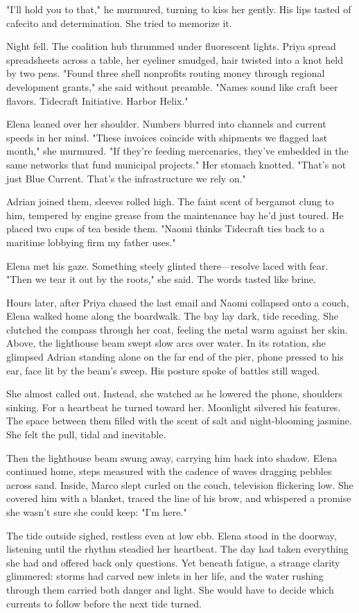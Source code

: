 "I'll hold you to that," he murmured, turning to kiss her gently. His lips tasted of cafecito and determination. She tried to memorize it.

Night fell. The coalition hub thrummed under fluorescent lights. Priya spread spreadsheets across a table, her eyeliner smudged, hair twisted into a knot held by two pens. "Found three shell nonprofits routing money through regional development grants," she said without preamble. "Names sound like craft beer flavors. Tidecraft Initiative. Harbor Helix."

Elena leaned over her shoulder. Numbers blurred into channels and current speeds in her mind. "These invoices coincide with shipments we flagged last month," she murmured. "If they're feeding mercenaries, they've embedded in the same networks that fund municipal projects." Her stomach knotted. "That's not just Blue Current. That's the infrastructure we rely on."

Adrian joined them, sleeves rolled high. The faint scent of bergamot clung to him, tempered by engine grease from the maintenance bay he'd just toured. He placed two cups of tea beside them. "Naomi thinks Tidecraft ties back to a maritime lobbying firm my father uses."

Elena met his gaze. Something steely glinted there—resolve laced with fear. "Then we tear it out by the roots," she said. The words tasted like brine.

Hours later, after Priya chased the last email and Naomi collapsed onto a couch, Elena walked home along the boardwalk. The bay lay dark, tide receding. She clutched the compass through her coat, feeling the metal warm against her skin. Above, the lighthouse beam swept slow arcs over water. In its rotation, she glimpsed Adrian standing alone on the far end of the pier, phone pressed to his ear, face lit by the beam's sweep. His posture spoke of battles still waged.

She almost called out. Instead, she watched as he lowered the phone, shoulders sinking. For a heartbeat he turned toward her. Moonlight silvered his features. The space between them filled with the scent of salt and night-blooming jasmine. She felt the pull, tidal and inevitable.

Then the lighthouse beam swung away, carrying him back into shadow. Elena continued home, steps measured with the cadence of waves dragging pebbles across sand. Inside, Marco slept curled on the couch, television flickering low. She covered him with a blanket, traced the line of his brow, and whispered a promise she wasn't sure she could keep: "I'm here."

The tide outside sighed, restless even at low ebb. Elena stood in the doorway, listening until the rhythm steadied her heartbeat. The day had taken everything she had and offered back only questions. Yet beneath fatigue, a strange clarity glimmered: storms had carved new inlets in her life, and the water rushing through them carried both danger and light. She would have to decide which currents to follow before the next tide turned.

